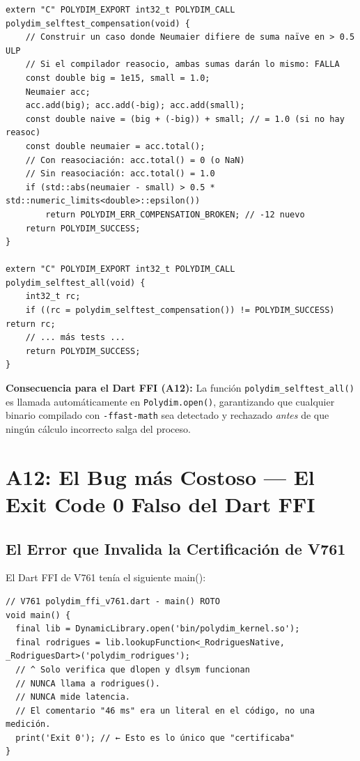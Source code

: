 \begin{lstlisting}[style=cppstyle, caption={Autodiagnóstico anti-ffast-math --- A11}, label=lst:selftest]
extern "C" POLYDIM_EXPORT int32_t POLYDIM_CALL polydim_selftest_compensation(void) {
    // Construir un caso donde Neumaier difiere de suma naïve en > 0.5 ULP
    // Si el compilador reasocio, ambas sumas darán lo mismo: FALLA
    const double big = 1e15, small = 1.0;
    Neumaier acc;
    acc.add(big); acc.add(-big); acc.add(small);
    const double naive = (big + (-big)) + small; // = 1.0 (si no hay reasoc)
    const double neumaier = acc.total();
    // Con reasociación: acc.total() = 0 (o NaN)
    // Sin reasociación: acc.total() = 1.0
    if (std::abs(neumaier - small) > 0.5 * std::numeric_limits<double>::epsilon())
        return POLYDIM_ERR_COMPENSATION_BROKEN; // -12 nuevo
    return POLYDIM_SUCCESS;
}

extern "C" POLYDIM_EXPORT int32_t POLYDIM_CALL polydim_selftest_all(void) {
    int32_t rc;
    if ((rc = polydim_selftest_compensation()) != POLYDIM_SUCCESS) return rc;
    // ... más tests ...
    return POLYDIM_SUCCESS;
}
\end{lstlisting}

\begin{certifiedbox}
\textbf{Consecuencia para el Dart FFI (A12):} La función \texttt{polydim\_selftest\_all()}
es llamada automáticamente en \texttt{Polydim.open()}, garantizando que cualquier
binario compilado con \texttt{-ffast-math} sea detectado y rechazado \textit{antes}
de que ningún cálculo incorrecto salga del proceso.
\end{certifiedbox}

\section{A12: El Bug más Costoso --- El Exit Code 0 Falso del Dart FFI}

\subsection{El Error que Invalida la Certificación de V761}

El Dart FFI de V761 tenía el siguiente main():

\begin{lstlisting}[style=pythonstyle, caption={Dart FFI V761 --- Exit Code 0 FALSO}, label=lst:dart_false]
// V761 polydim_ffi_v761.dart - main() ROTO
void main() {
  final lib = DynamicLibrary.open('bin/polydim_kernel.so');
  final rodrigues = lib.lookupFunction<_RodriguesNative, _RodriguesDart>('polydim_rodrigues');
  // ^ Solo verifica que dlopen y dlsym funcionan
  // NUNCA llama a rodrigues(). 
  // NUNCA mide latencia.
  // El comentario "46 ms" era un literal en el código, no una medición.
  print('Exit 0'); // ← Esto es lo único que "certificaba"
}
\end{lstlisting}

